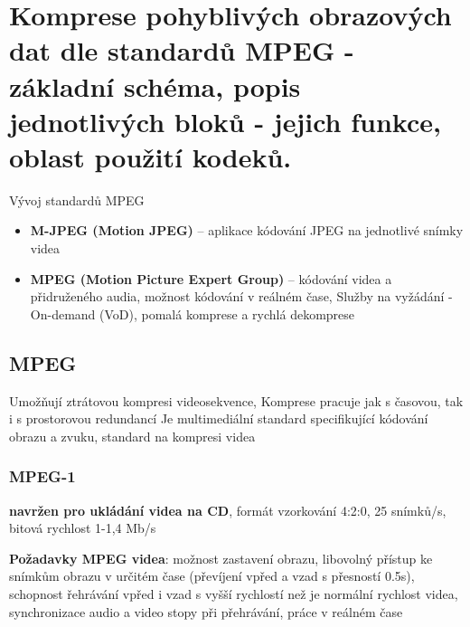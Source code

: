 \newpage
\section{Komprese pohyblivých obrazových dat dle standardů MPEG - základní schéma, popis jednotlivých bloků - jejich funkce, oblast použití kodeků.}

Vývoj standardů MPEG
\begin{itemize}
    \item \textbf{M-JPEG (Motion JPEG)} -- aplikace kódování JPEG na jednotlivé snímky videa
    \item \textbf{MPEG (Motion Picture Expert Group)} -- kódování videa a přidruženého audia, možnost kódování v reálném čase, Služby na vyžádání - On-demand (VoD), pomalá komprese a rychlá dekomprese
\end{itemize}

\subsection{MPEG}
Umožňují ztrátovou kompresi videosekvence, Komprese pracuje jak s časovou, tak i s prostorovou redundancí \newline
Je multimediální standard specifikující kódování obrazu a zvuku, standard na kompresi videa

\subsubsection{MPEG-1}
\textbf{navržen pro ukládání videa na CD}, formát vzorkování 4:2:0, 25 snímků/s, bitová rychlost 1-1,4 Mb/s

\textbf{Požadavky MPEG videa}: možnost zastavení obrazu, libovolný přístup ke snímkům obrazu v určitém čase (převíjení
vpřed a vzad s přesností 0.5s), schopnost řehrávání vpřed i vzad s vyšší rychlostí než je normální rychlost videa,
synchronizace audio a video stopy při přehrávání, práce v reálném čase


